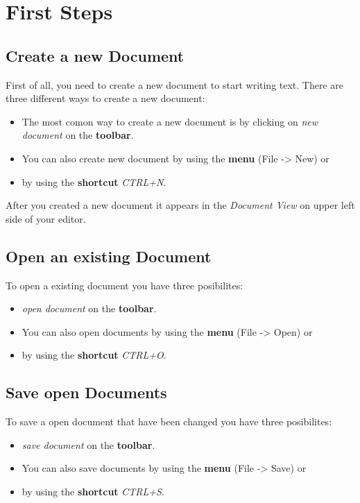 \documentclass[11pt,a4paper]{article}
\begin{document}
\newpage
\section{First Steps}
\label{first_steps}

\subsection{Create a new Document}
First of all, you need to create a new document to start writing text. There are three different ways to create a new document:
\begin{itemize}
\item The most comon way to create a new document is by clicking on \textit{new document} on the \textbf{toolbar}.
\item You can also create new document by using the \textbf{menu} (File -> New) or
\item by using the \textbf{shortcut} \textit{CTRL+N}.
\end{itemize}

After you created a new document it appears in the \textit{Document View} on upper left side of your editor.

\subsection{Open an existing Document}
To open a existing document you have three posibilites:
\begin{itemize}
\item \textit{open document} on the \textbf{toolbar}.
\item You can also open documents by using the \textbf{menu} (File -> Open) or
\item by using the \textbf{shortcut} \textit{CTRL+O}.
\end{itemize}

\subsection{Save open Documents}

To save a open document that have been changed you have three posibilites:
\begin{itemize}
\item \textit{save document} on the \textbf{toolbar}.
\item You can also save documents by using the \textbf{menu} (File -> Save) or
\item by using the \textbf{shortcut} \textit{CTRL+S}.
\end{itemize}
\end{document}
